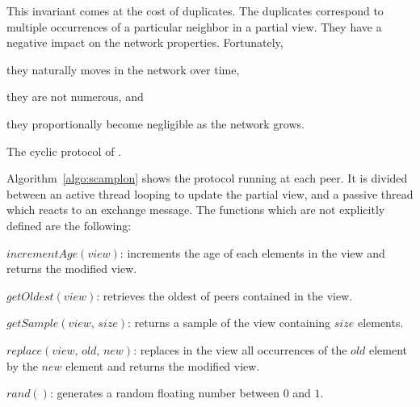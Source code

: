 This invariant comes at the cost of duplicates. The duplicates correspond to
multiple occurrences of a particular neighbor in a partial view. They have a
negative impact on the network properties. Fortunately,
\begin{inparaenum}[(i)]
\item they naturally moves in the network over time,
\item they are not numerous, and
\item they proportionally become negligible as the network grows.
\end{inparaenum}

\begin{algorithm}[h]
  
  \caption{\label{algo:scamplon}The cyclic protocol of \SPRAY.}
\end{algorithm}

Algorithm~\ref{algo:scamplon} shows the \SPRAY protocol running at each
peer. It is divided between an active thread looping to update the partial
view, and a passive thread which reacts to an exchange message. The functions
which are not explicitly defined are the following:
\begin{compactitem}
\item $incrementAge(view)$: increments the age of each elements in the view
  and returns the modified view.
\item $getOldest(view)$: retrieves the oldest of peers contained in the view.
\item $getSample(view, \, size)$: returns a sample of the view containing
  $size$ elements.
\item $replace(view,\,old,\,new)$: replaces in the view all occurrences of
  the $old$ element by the $new$ element and returns the modified view.
\item $rand()$: generates a random floating number between $0$ and $1$.
\end{compactitem}


